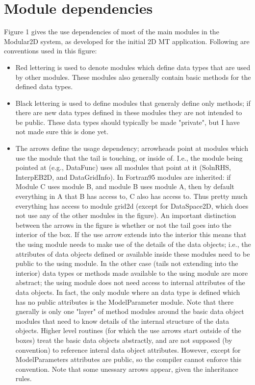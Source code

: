 \documentclass[12pt]{article}
\begin{document}
\section{Module dependencies}

Figure 1 gives the use dependencies of most of the main modules in 
the Modular2D system, as developed for the initial 2D MT
application.  Following are conventions used in this figure:

\begin{itemize}
\item
Red lettering is used to denote modules which define
data types that are used by other modules.  These modules
also generally contain basic methods for the defined
data types.  

\item
Black lettering is used to define modules that generaly define 
only methods; if there are new data types defined in these
modules they are not intended to be public.  These data types
should typically be made "private", but I have not made sure
this is done yet.

\item
The arrows define the usage dependency; arrowheads point
at modules which use the module that the tail is touching,
or inside of.  I.e., the module being pointed at (e.g.,
DataFunc) uses all modules that point at it (SolnRHS, InterpEB2D,
and DataGridInfo).  In Fortran95 modules are inherited: if Module
C uses module B, and module B uses module A, then by default
everything in A that B has access to, C also has access to.
Thus pretty much everything has access to module grid2d
(except for DataSpace2D, which does not use any of the other
modules in the figure).  An important distinction between the arrows
in the figure is whether or not the tail goes into the interior of
the box.  If the use arrow extends into the interior this means
that the using module needs to make use of the details of the
data objects; i.e., the attributes of data objects defined
or available inside these modules  need to be public to 
the using module.  In the other case (tails not extending into
the interior) data types or methods made available to the
using module are more abstract; the using module does not
need access to internal attributes of the data objects.  In
fact, the only module where an data type is defined which
has no public attributes is the ModelParameter module.
Note that there gnerally is only one "layer" of method
modules around the basic data object modules that need
to know details of the internal structure of the data objects.
Higher level routines (for which the use arrows start outside
of the boxes) treat the basic data objects abstractly, and
are not supposed  (by convention) to reference interal data object attributes.
However, except for ModelParameters attributes are public,
so the compiler cannot enforce this convention.
Note that some unessary arrows appear, given
the inheritance rules.  


\end{itemize}
\end{document}
